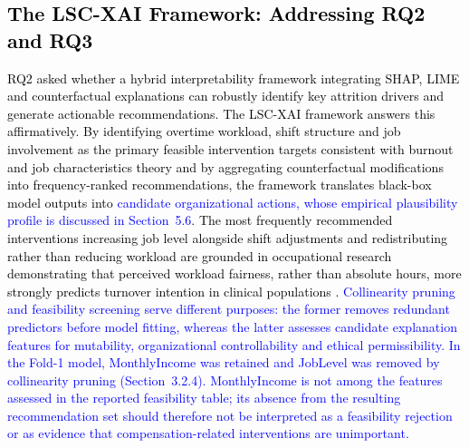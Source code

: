 \documentclass[a4paper,fleqn]{cas-sc}
\begin{document}
{\subsection{\textcolor{black}{The LSC-XAI Framework: Addressing RQ2 and RQ3}}
\textcolor{black}{RQ2 asked whether a hybrid interpretability framework integrating SHAP, LIME and counterfactual explanations can robustly identify key attrition drivers and generate actionable recommendations. The LSC-XAI framework answers this affirmatively. By identifying overtime workload, shift structure and job involvement as the primary feasible intervention targets consistent with burnout and job characteristics theory \cite{hackman1976motivation} and by aggregating counterfactual modifications into frequency-ranked recommendations, the framework translates black-box model outputs into \textcolor{blue}{candidate organizational actions, whose empirical plausibility profile is discussed in Section~5.6}. The most frequently recommended interventions increasing job level alongside shift adjustments and redistributing rather than reducing workload are grounded in occupational research demonstrating that perceived workload fairness, rather than absolute hours, more strongly predicts turnover intention in clinical populations \cite{LavoieTremblay2010}. \textcolor{blue}{Collinearity pruning and feasibility screening serve different purposes: the former removes redundant predictors before model fitting, whereas the latter assesses candidate explanation features for mutability, organizational controllability and ethical permissibility. In the Fold-1 model, MonthlyIncome was retained and JobLevel was removed by collinearity pruning (Section~3.2.4). MonthlyIncome is not among the features assessed in the reported feasibility table; its absence from the resulting recommendation set should therefore not be interpreted as a feasibility rejection or as evidence that compensation-related interventions are unimportant.}}

}
\end{document}
